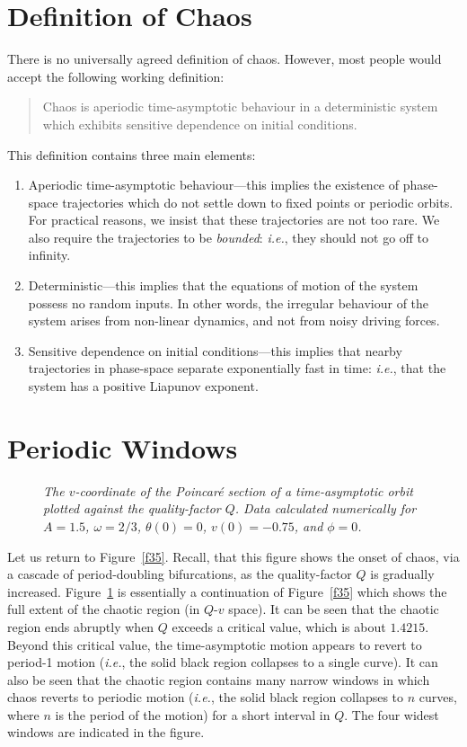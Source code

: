 \section{Definition of Chaos}
There is no universally agreed definition of chaos. However, most people would accept the
following working definition:
\begin{quote}
Chaos is aperiodic time-asymptotic behaviour in a deterministic system which
exhibits sensitive dependence on initial conditions.
\end{quote}
This definition contains three main elements:
\begin{enumerate}
\item Aperiodic time-asymptotic behaviour---this implies the existence of
phase-space trajectories which do not settle down to fixed points or
periodic orbits. For practical reasons, we  insist that these trajectories
are not too rare. We also require the trajectories to be {\em bounded}:
{\em i.e.}, they should not go off to infinity. 
\item Deterministic---this implies that the equations of motion of the system  possess no
random inputs. In other words, the irregular behaviour of the system   arises
from non-linear dynamics, and not from noisy driving forces. 
\item Sensitive dependence on initial conditions---this implies that nearby
trajectories in phase-space separate exponentially fast in time: {\em i.e.}, that the
system has a positive Liapunov exponent.
\end{enumerate}

\section{Periodic Windows}
\begin{figure}
\centerline{}
\caption{\em The $v$-coordinate of the Poincar\'{e} section of a time-asymptotic orbit
plotted against the quality-factor $Q$. Data
 calculated numerically for
$A=1.5$, $\omega=2/3$, $\theta(0)=0$, $v(0)=-0.75$,
 and $\phi=0$.}\label{fx44}
\end{figure}

Let us return to Figure~\ref{f35}. Recall, that this figure shows the onset of
chaos, via a cascade of period-doubling bifurcations, as the quality-factor $Q$
is gradually increased. Figure~\ref{fx44} is essentially a continuation of Figure~\ref{f35}
which shows the full extent of the chaotic region (in $Q$-$v$ space). It can be
seen that the chaotic region ends abruptly when $Q$ exceeds a critical
value, which is about $1.4215$. Beyond this critical value, the time-asymptotic motion appears to
revert to period-1 motion ({\em i.e.}, the solid black region collapses to a single curve). 
It can also be seen that the chaotic region contains many narrow  windows in which
chaos reverts to periodic motion  ({\em i.e.}, the solid black region collapses
to $n$ curves, where $n$ is the period of the motion) for a short interval in $Q$. The four widest
windows are indicated in the figure.


